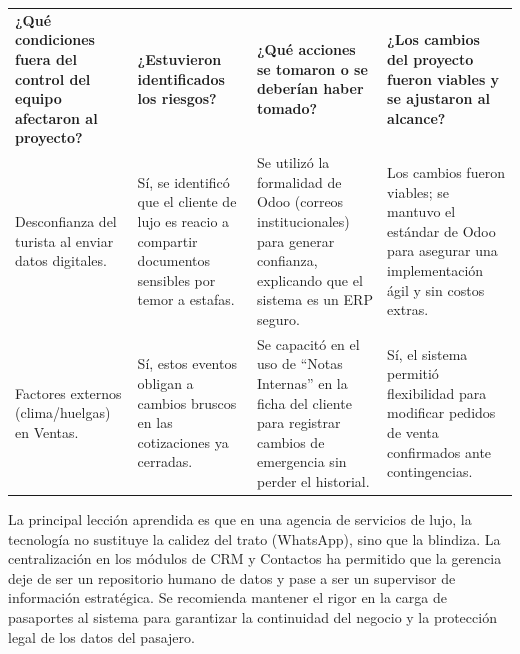 \documentclass[11pt]{article}
\begin{document}
\begin{longtable}{|p{3.8cm}|p{3.8cm}|p{3.8cm}|p{3.8cm}|}
\rowcolor{RoundGray}\multicolumn{4}{|l|}{\textbf{Tercera Ronda}} \\ \hline
\rowcolor{HeaderGray}\textbf{¿Qué condiciones fuera del control del equipo afectaron al proyecto?} & \textbf{¿Estuvieron identificados los riesgos?} & \textbf{¿Qué acciones se tomaron o se deberían haber tomado?} & \textbf{¿Los cambios del proyecto fueron viables y se ajustaron al alcance?} \\ \hline
Desconfianza del turista al enviar datos digitales. &
Sí, se identificó que el cliente de lujo es reacio a compartir documentos sensibles por temor a estafas. &
Se utilizó la formalidad de Odoo (correos institucionales) para generar confianza, explicando que el sistema es un ERP seguro. &
Los cambios fueron viables; se mantuvo el estándar de Odoo para asegurar una implementación ágil y sin costos extras. \\ \hline
Factores externos (clima/huelgas) en Ventas. &
Sí, estos eventos obligan a cambios bruscos en las cotizaciones ya cerradas. &
Se capacitó en el uso de ``Notas Internas'' en la ficha del cliente para registrar cambios de emergencia sin perder el historial. &
Sí, el sistema permitió flexibilidad para modificar pedidos de venta confirmados ante contingencias. \\ \hline
\end{longtable}

La principal lección aprendida es que en una agencia de servicios de lujo, la tecnología no sustituye la calidez del trato (WhatsApp), sino que la blindiza. La centralización en los módulos de CRM y Contactos ha permitido que la gerencia deje de ser un repositorio humano de datos y pase a ser un supervisor de información estratégica. Se recomienda mantener el rigor en la carga de pasaportes al sistema para garantizar la continuidad del negocio y la protección legal de los datos del pasajero.
\end{document}
